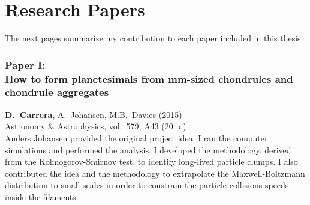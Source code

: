 \documentclass[11pt]{book}
\begin{document}



\part{Research Papers}


The next pages summarize my contribution to each paper included in this thesis.

\newpage

\section*{Paper I:\\How to form planetesimals from mm-sized chondrules and chondrule aggregates}

\textbf{D.~Carrera}, A.~Johansen, M.B.~Davies (2015) \\
Astronomy \& Astrophysics, vol.~579, A43 (20 p.)\\[6mm]

Anders Johansen provided the original project idea. I ran the computer simulations and performed the analysis. I developed the methodology, derived from the Kolmogorov-Smirnov test, to identify long-lived particle clumps. I also contributed the idea and the methodology to extrapolate the Maxwell-Boltzmann distribution to small scales in order to constrain the particle collisions speeds inside the filaments.



%
\cleardoublepage
{}
\thispagestyle{empty}
\vspace*{2cm}  %
\hfill{ 
	\fontsize{20}{30}
	\selectfont {\bf Paper I}
}
\marginpar{\rule[-4mm]{50mm}{14mm}} %
\vfill
\cleardoublepage
%
\end{document}
